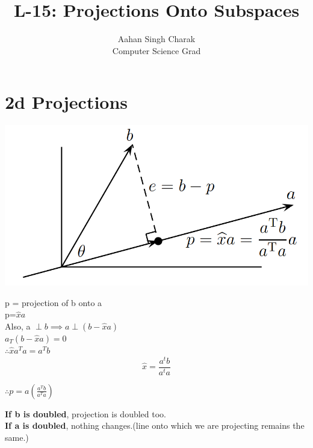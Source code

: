 \documentclass[]{article}
\title{L-15: Projections Onto Subspaces}
\author{Aahan Singh Charak\\Computer Science Grad}
\begin{document}
	
	\maketitle
	
	\section{2d Projections}
	\begin{center}
		\includegraphics[scale=.25]{projection}
	\end{center}
	\vspace{10pt}
	
p = projection of b onto a\\

p=$\hat{x}a$\\

Also, a $\perp b \implies a \perp (b-\hat{x}a)$\\

$a_T(b-\hat{x}a)=0$\\

$\therefore \hat{x}a^Ta = a^Tb$\\
\begin{equation}
\hat{x}=\frac{a^tb}{a^ta}
\end{equation}

$\therefore p=a(\frac{a^Tb}{a^Ta})$\\

\begin{mytheorem}[title=Important Notes]
	\textbf{If b is doubled}, projection is doubled too.\\
	
	\textbf{If a is doubled}, nothing changes.(line onto which we are projecting remains the same.)
\end{mytheorem}

\vspace{10pt}
\end{document}

